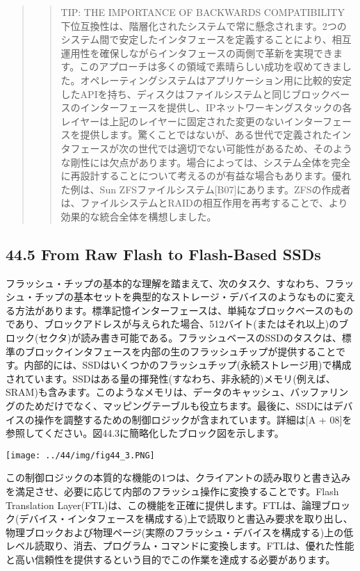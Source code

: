 \begin{quote}
\begin{quote}
TIP: THE IMPORTANCE OF BACKWARDS COMPATIBILITY\\
下位互換性は、階層化されたシステムで常に懸念されます。2つのシステム間で安定したインタフェースを定義することにより、相互運用性を確保しながらインタフェースの両側で革新を実現できます。このアプローチは多くの領域で素晴らしい成功を収めてきました。オペレーティングシステムはアプリケーション用に比較的安定したAPIを持ち、ディスクはファイルシステムと同じブロックベースのインターフェースを提供し、IPネットワーキングスタックの各レイヤーは上記のレイヤーに固定された変更のないインターフェースを提供します。驚くことではないが、ある世代で定義されたインタフェースが次の世代では適切でない可能性があるため、そのような剛性には欠点があります。場合によっては、システム全体を完全に再設計することについて考えるのが有益な場合もあります。優れた例は、Sun
ZFSファイルシステム{[}B07{]}にあります。ZFSの作成者は、ファイルシステムとRAIDの相互作用を再考することで、より効果的な統合全体を構想しました。
\end{quote}
\end{quote}

\hypertarget{from-raw-flash-to-flash-based-ssds}{%
\subsection*{44.5 From Raw Flash to Flash-Based
SSDs}\label{from-raw-flash-to-flash-based-ssds}}

フラッシュ・チップの基本的な理解を踏まえて、次のタスク、すなわち、フラッシュ・チップの基本セットを典型的なストレージ・デバイスのようなものに変える方法があります。標準記憶インターフェースは、単純なブロックベースのものであり、ブロックアドレスが与えられた場合、512バイト(またはそれ以上)のブロック(セクタ)が読み書き可能である。フラッシュベースのSSDのタスクは、標準のブロックインタフェースを内部の生のフラッシュチップが提供することです。内部的には、SSDはいくつかのフラッシュチップ(永続ストレージ用)で構成されています。SSDはある量の揮発性(すなわち、非永続的)メモリ(例えば、SRAM)も含みます。このようなメモリは、データのキャッシュ、バッファリングのためだけでなく、マッピングテーブルも役立ちます。最後に、SSDにはデバイスの操作を調整するための制御ロジックが含まれています。詳細は{[}A
+ 08{]}を参照してください。図44.3に簡略化したブロック図を示します。

\texttt{[image: ../44/img/fig44\_3.PNG]}

この制御ロジックの本質的な機能の1つは、クライアントの読み取りと書き込みを満足させ、必要に応じて内部のフラッシュ操作に変換することです。Flash
Translation
Layer(FTL)は、この機能を正確に提供します。FTLは、論理ブロック(デバイス・インタフェースを構成する)上で読取りと書込み要求を取り出し、物理ブロックおよび物理ページ(実際のフラッシュ・デバイスを構成する)上の低レベル読取り、消去、プログラム・コマンドに変換します。FTLは、優れた性能と高い信頼性を提供するという目的でこの作業を達成する必要があります。


